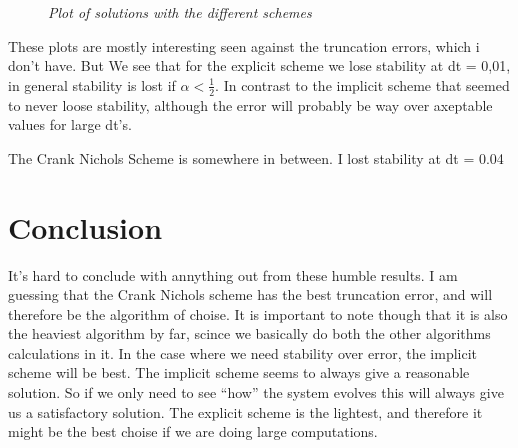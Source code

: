 \documentclass[norsk,a4paper,12pt]{article}
\begin{document}
\begin{figure}[H]
\begin{center}
  \end{center}
 \caption{\textit{Plot of solutions with the different schemes}}
  \label{fig:edge}
\end{figure}

These plots are mostly interesting seen against the truncation errors, which i don't have. But We see that for the explicit scheme 
we lose stability at dt = 0,01, in general stability is lost if $\alpha < \frac{1}{2}$. In contrast to the implicit scheme that seemed
to never loose stability, although the error will probably be way over axeptable values for large dt's.

The Crank Nichols Scheme is somewhere in between. I lost stability at dt = 0.04


\section*{Conclusion}

It's hard to conclude with annything out from these humble results. I am guessing that the Crank Nichols scheme has the best
truncation error, and will therefore be the algorithm of choise. It is important to note though that it is also the heaviest algorithm
by far, scince we basically do both the other algorithms calculations in it. In the case where we need stability over error, the 
implicit scheme will be best. The implicit scheme seems to always give a reasonable solution. So if we only need to see ``how''
the system evolves this will always give us a satisfactory solution. The explicit scheme is the lightest, and therefore it might 
be the best choise if we are doing large computations.
\end{document}
